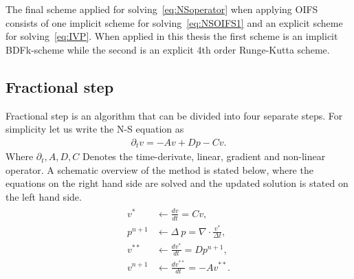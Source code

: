 The final scheme applied for solving~\ref{eq:NSoperator} when applying OIFS consists of one implicit scheme for 
solving~\ref{eq:NSOIFS1} and an explicit scheme for solving~\ref{eq:IVP}. When applied in this thesis the 
first scheme is an implicit BDFk-scheme while the second is an explicit 4th order Runge-Kutta scheme. 


\subsection{Fractional step} 
\label{fracstep}

Fractional step is an algorithm that can be divided into four separate steps. For simplicity let us write the N-S
equation as 
\begin{align}
    \partial_t v = -Av + Dp - Cv.
    \label{eq:NSfracstep}
\end{align}
Where $\partial_t, A,D,C$ Denotes the time-derivate, linear, gradient and non-linear operator. 
A schematic overview of the method is stated below, where the equations on the right hand side are 
solved and the updated solution is stated on the left hand side.
\begin{align}
    \begin{split}
        v^* &\leftarrow \frac{dv}{dt}=Cv,\\
    p^{n+1} &\leftarrow \Delta\: p = \nabla \cdot \frac{v^*}{\Delta t},\\
    v^{**} &\leftarrow  \frac{dv^*}{dt} =Dp^{n+1},\\
    v^{n+1} &\leftarrow \frac{dv^{**}}{dt}= -Av^{**}.
    \end{split}
    \label{eq:fracstep}
\end{align}

